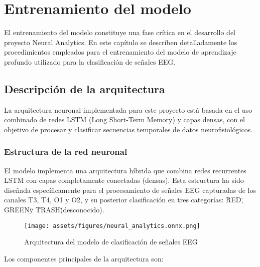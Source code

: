 \chapter{Entrenamiento del modelo}\label{ch:model_training}

El entrenamiento del modelo constituye una fase crítica en el desarrollo del proyecto Neural Analytics. En este capítulo se describen detalladamente los procedimientos empleados para el entrenamiento del modelo de aprendizaje profundo utilizado para la clasificación de señales EEG.

\section{Descripción de la arquitectura}

La arquitectura neuronal implementada para este proyecto está basada en el uso combinado de redes LSTM (Long Short-Term Memory) y capas densas, con el objetivo de procesar y clasificar secuencias temporales de datos neurofisiológicos.

\subsection{Estructura de la red neuronal}

El modelo implementa una arquitectura híbrida que combina redes recurrentes LSTM con capas completamente conectadas (densas). Esta estructura ha sido diseñada específicamente para el procesamiento de señales EEG capturadas de los canales T3, T4, O1 y O2, y su posterior clasificación en tres categorías: \"RED\", \"GREEN\" y \"TRASH\" (desconocido).

\begin{figure}[ht]
    \centering
    \texttt{[image: assets/figures/neural\_analytics.onnx.png]}
    \caption{Arquitectura del modelo de clasificación de señales EEG}
    \label{fig:model_architecture}
\end{figure}

Los componentes principales de la arquitectura son:

